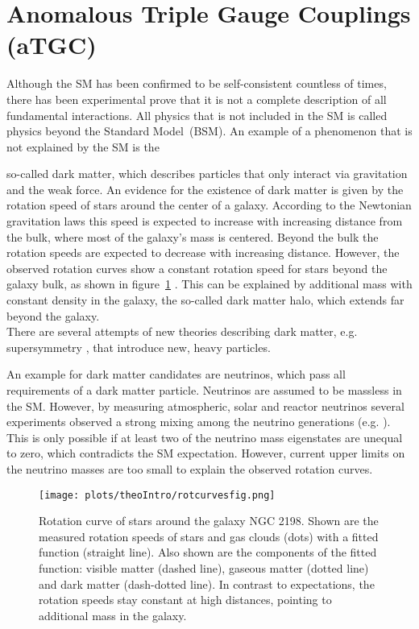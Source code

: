 \section{Anomalous Triple Gauge Couplings (aTGC)}
\label{sec:aTGC}
Although the SM has been confirmed to be self-consistent countless of times, there has been experimental prove that it is not a complete description of all fundamental interactions. All physics that is not included in the SM is called physics beyond the Standard Model~(BSM). An example of a phenomenon that is not explained by the SM is the 



so-called dark matter, which describes particles that only interact via gravitation and the weak force. An evidence for the existence of dark matter is given by the rotation speed of stars around the center of a galaxy. According to the Newtonian gravitation laws this speed is expected to increase with increasing distance from the bulk, where most of the galaxy's mass is centered. Beyond the bulk the rotation speeds are expected to decrease with increasing distance. However, the observed rotation curves show a constant rotation speed for stars beyond the galaxy bulk, as shown in figure~\ref{fig:theo:rotcurves} \cite{rotcurves}. This can be explained by additional mass with constant density in the galaxy, the so-called dark matter halo, which extends far beyond the galaxy.\\ 
There are several attempts of new theories describing dark matter, e.g. supersymmetry \cite{SUSY}, that introduce new, heavy particles. 

 An example for dark matter candidates are neutrinos, which pass all requirements of a dark matter particle. Neutrinos are assumed to be massless in the SM. However, by measuring atmospheric, solar and reactor neutrinos several experiments observed a strong mixing among the neutrino generations (e.g. \cite{nuoszi1,nuoszi2,nuoszi3,nuoszi4}). This is only possible if at least two of the neutrino mass eigenstates are unequal to zero, which contradicts the SM expectation. However, current upper limits on the neutrino masses are too small \cite{numasses1,numasses2} to explain the observed rotation curves.\\


 
\begin{figure}
	\centering
	\texttt{[image: plots/theoIntro/rotcurvesfig.png]}
	\caption[Rotation curve of stars around the galaxy NGC 2198]{Rotation curve of stars around the galaxy NGC 2198. Shown are the measured rotation speeds of stars and gas clouds (dots) with a fitted function (straight line). Also shown are the components of the fitted function: visible matter (dashed line), gaseous matter (dotted line) and dark matter (dash-dotted line). In contrast to expectations, the rotation speeds stay constant at high distances, pointing to additional mass in the galaxy.}
	\label{fig:theo:rotcurves}
\end{figure}


